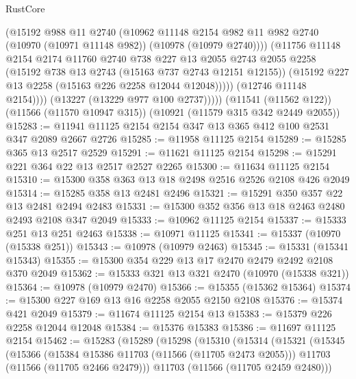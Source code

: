 \begin{lexlean}{RustCore}
\begin{coremodule}
                    (@15192
                      @988
                      @11
                      @2740
                      (@10962
                        @11148
                        @2154
                        @982
                        @11
                        @982
                        @2740
                        (@10970 (@10971 @11148 @982))
                        (@10978 (@10979 @2740))))
                    (@11756
                      @11148
                      @2154
                      @2174
                      @11760
                      @2740
                      @738
                      @227
                      @13
                      @2055
                      @2743
                      @2055
                      @2258
                      (@15192 @738 @13 @2743 (@15163 @737 @2743 @12151 @12155))
                      (@15192 @227 @13 @2258 (@15163 @226 @2258 @12044 @12048)))))
                (@12746 @11148 @2154))))
          (@13227 (@13229 @977 @100 @2737)))))
    (@11541 (@11562 @122))
    (@11566 (@11570 @10947 @315))
    (@10921 (@11579 @315 @342 @2449 @2055))
@15283 := @11941 @11125 @2154 @2154 @347 @13 @365 @412 @100 @2531 @347 @2089 @2667 @2726
@15285 := @11958 @11125 @2154
@15289 := @15285 @365 @13 @2517 @2529
@15291 := @11621 @11125 @2154
@15298 := @15291 @221 @364 @22 @13 @2517 @2527 @2265
@15300 := @11634 @11125 @2154
@15310 := @15300 @358 @363 @13 @18 @2498 @2516 @2526 @2108 @426 @2049
@15314 := @15285 @358 @13 @2481 @2496
@15321 := @15291 @350 @357 @22 @13 @2481 @2494 @2483
@15331 := @15300 @352 @356 @13 @18 @2463 @2480 @2493 @2108 @347 @2049
@15333 := @10962 @11125 @2154
@15337 := @15333 @251 @13 @251 @2463
@15338 := @10971 @11125
@15341 := @15337 (@10970 (@15338 @251))
@15343 := @10978 (@10979 @2463)
@15345 := @15331 (@15341 @15343)
@15355 := @15300 @354 @229 @13 @17 @2470 @2479 @2492 @2108 @370 @2049
@15362 := @15333 @321 @13 @321 @2470 (@10970 (@15338 @321))
@15364 := @10978 (@10979 @2470)
@15366 := @15355 (@15362 @15364)
@15374 := @15300 @227 @169 @13 @16 @2258 @2055 @2150 @2108
@15376 := @15374 @421 @2049
@15379 := @11674 @11125 @2154 @13
@15383 := @15379 @226 @2258 @12044 @12048
@15384 := @15376 @15383
@15386 := @11697 @11125 @2154
@15462 := @15283
    (@15289
      (@15298
        (@15310
          (@15314
            (@15321
              (@15345
                (@15366
                  (@15384 @15386 @11703 (@11566 (@11705 @2473 @2055)))
                  @11703
                  (@11566 (@11705 @2466 @2479)))
                @11703
                (@11566 (@11705 @2459 @2480)))

\end{coremodule}
\end{lexlean}
